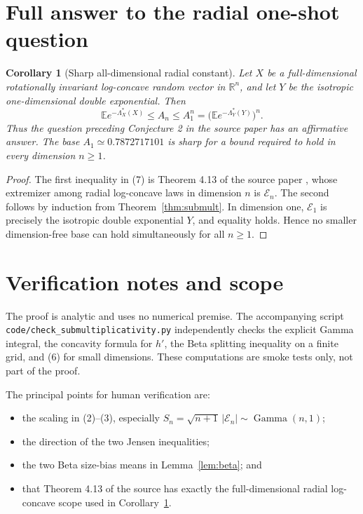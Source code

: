 \documentclass[11pt]{article}
\newtheorem{corollary}{Corollary}
\newcommand{\E}{\mathbb E}
\newcommand{\R}{\mathbb R}
\newcommand{\cE}{\mathcal E}
\begin{document}
\section{Full answer to the radial one-shot question}

\begin{corollary}[Sharp all-dimensional radial constant]\label{cor:answer}
Let $X$ be a full-dimensional rotationally invariant log-concave random
vector in $\R^n$, and let $Y$ be the isotropic one-dimensional double
exponential.  Then
\[
  \E e^{-\Lambda_X^*(X)}
  \leq A_n
  \leq A_1^n
  =\bigl(\E e^{-\Lambda_Y^*(Y)}\bigr)^n.                 \tag{7}
\]
Thus the question preceding Conjecture 2 in the source paper has an
affirmative answer.  The base $A_1\simeq0.7872717101$ is sharp for a bound
required to hold in every dimension $n\geq1$.
\end{corollary}

\begin{proof}
The first inequality in (7) is Theorem 4.13 of the source paper
\cite{BC}, whose extremizer among radial log-concave laws in dimension $n$
is $\cE_n$.  The second follows by induction from
Theorem~\ref{thm:submult}.  In dimension one, $\cE_1$ is precisely the
isotropic double exponential $Y$, and equality holds.  Hence no smaller
dimension-free base can hold simultaneously for all $n\geq1$.
\end{proof}

\section{Verification notes and scope}

The proof is analytic and uses no numerical premise.  The accompanying script
\nolinkurl{code/check_submultiplicativity.py} independently checks the explicit
Gamma integral, the concavity formula for $h'$, the Beta splitting inequality
on a finite grid, and (6) for small dimensions.  These computations are smoke
tests only, not part of the proof.

The principal points for human verification are:
\begin{itemize}
  \item the scaling in (2)--(3), especially
  $S_n=\sqrt{n+1}\,|\cE_n|\sim\operatorname{Gamma}(n,1)$;
  \item the direction of the two Jensen inequalities;
  \item the two Beta size-bias means in Lemma~\ref{lem:beta}; and
  \item that Theorem 4.13 of the source has exactly the full-dimensional
  radial log-concave scope used in Corollary~\ref{cor:answer}.
\end{itemize}
\end{document}
